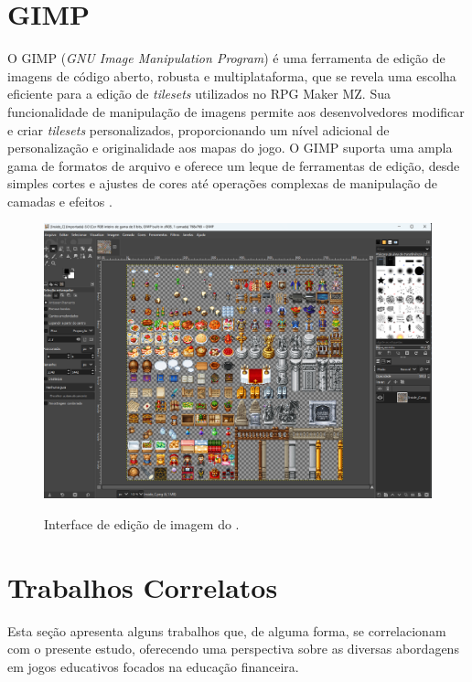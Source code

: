 \newpage

\section{GIMP}

O GIMP (\textit{GNU Image Manipulation Program}) é uma ferramenta de edição de imagens de código aberto, robusta e multiplataforma, que se revela uma escolha eficiente para a edição de \textit{tilesets} utilizados no RPG Maker MZ. Sua funcionalidade de manipulação de imagens permite aos desenvolvedores modificar e criar \textit{tilesets} personalizados, proporcionando um nível adicional de personalização e originalidade aos mapas do jogo. O GIMP suporta uma ampla gama de formatos de arquivo e oferece um leque de ferramentas de edição, desde simples cortes e ajustes de cores até operações complexas de manipulação de camadas e efeitos \cite{GIMP_Documentation}.

\begin{figure}[ht]
	\centering
	\caption{Interface de edição de imagem do \cite{GIMP_Documentation}.}
	\includegraphics[scale=0.3]{Textuais/Pictures/Gimp.png}
	\label{fig:gimp-interface}
\end{figure}

\section{Trabalhos Correlatos}
Esta seção apresenta alguns trabalhos que, de alguma forma, se correlacionam com o presente estudo, oferecendo uma perspectiva sobre as diversas abordagens em jogos educativos focados na educação financeira.


